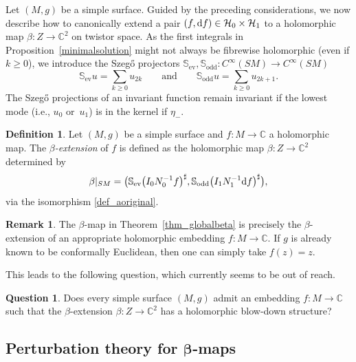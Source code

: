 \documentclass[10pt,a4paper]{amsart}
\numberwithin{equation}{section}
\theoremstyle{definition}
\newtheorem{Definition}[Theorem]{Definition}
\newtheorem{Remark}[Theorem]{Remark}
\newtheorem{Question}[Theorem]{Question}
\newcommand{\C}{\mathbb{C}} %
\newcommand{\ev}{\mathrm{ev}}
\newcommand{\1}{{\bf 1}}
\begin{document}
Let $(M,g)$ be a simple surface. Guided by the preceding considerations, we now describe how to canonically extend a pair $(f,{\rm d}f)\in \mathcal H_0\times \mathcal H_1$ to a holomorphic map $\beta\colon Z\rightarrow \C^2$ on twistor space. As the first integrals in Proposition~\ref{minimalsolution} might not always be fibrewise holomorphic (even if $k\ge 0$), we introduce the Szeg\H{o} projectors $\mathbb S_{\ev},\mathbb S_{\mathrm{odd}}\colon C^\infty(SM)\rightarrow C^\infty(SM)$
\[
\mathbb S_{\ev}u=\sum_{k\ge 0} u_{2k}\qquad \text{and} \qquad \mathbb S_{\mathrm{odd}} u = \sum_{k\ge 0} u_{2k+1}.
\]
The Szeg\H{o} projections of an invariant function remain invariant if the lowest mode (i.e., $u_0$ or~$u_1$) is in the kernel if $\eta_-$.

\begin{Definition}\label{def_betaextension}
 Let $(M,g)$ be a simple surface and $f\colon M\rightarrow \C$ a holomorphic map. The {\it $\beta$-extension} of $f$ is defined as the holomorphic map $\beta\colon Z \rightarrow \C^2$ determined by
 \[
 	\beta|_{SM} = \bigl(\mathbb S_{\ev} \bigl(I_0N_0^{-1} f \bigr)^\sharp, \mathbb S_{\mathrm{odd}} \bigl(I_1N_1^{-1}{\rm d}f\bigr)^{\sharp}\bigr),
 \]
via the isomorphism \eqref{def_aoriginal}.
\end{Definition}



\begin{Remark}\label{rmkonglobbeta}
The $\beta$-map in Theorem~\ref{thm_globalbeta} is precisely the $\beta$-extension of an appropriate holomorphic embedding $f\colon M\rightarrow \C$. If $g$ is already known to be conformally Euclidean, then one can simply take $f(z)=z$.
\end{Remark}

This leads to the following question, which currently seems to be out of reach.

\begin{Question}\label{questionsimplebds}
	Does every simple surface $(M,g)$ admit an embedding $f\colon M\rightarrow \C$ such that the $\beta$-extension $\beta\colon Z\rightarrow \C^2$ has a holomorphic blow-down structure?
\end{Question}

\subsection[Perturbation theory for beta-maps]{Perturbation theory for $\boldsymbol{\beta}$-maps}\label{s_perturbationtheory}
\end{document}
